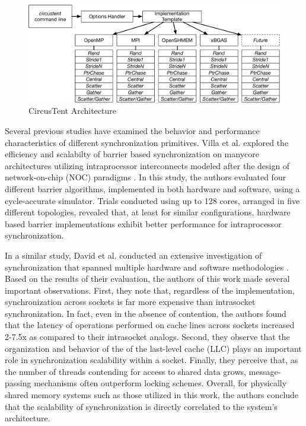 
\begin{figure}[!t]
\centering
\includegraphics[width=5in]{figures/arch.pdf}
\caption{CircusTent Architecture}
\label{fig:ct_arch}
\end{figure}


Several previous studies have examined the behavior and performance characteristics of different synchronization primitives.
Villa et al. explored the efficiency and scalabilty of barrier based synchronization on manycore architectures utilizing intraprocessor interconnects modeled after the design of network-on-chip (NOC) paradigms \cite{villa2008barriers}.
In this study, the authors evaluated four different barrier algorithms, implemented in both hardware and software, using a cycle-accurate simulator.
Trials conducted using up to 128 cores, arranged in five different topologies, revealed that, at least for similar configurations, hardware based barrier implementations exhibit better performance for intraprocessor synchronization.

In a similar study, David et al. conducted an extensive investigation of synchronization that spanned multiple hardware and software methodologies \cite{david2013sync}.
Based on the results of their evaluation, the authors of this work made several important observations.
First, they note that, regardless of the implementation, synchronization across sockets is far more expensive than intrasocket synchronization.
In fact, even in the absence of contention, the authors found that the latency of operations performed on cache lines across sockets increased 2-7.5x as compared to their intrasocket analogs.
Second, they observe that the organization and behavior of the of the last-level cache (LLC) plays an important role in synchronization scalability within a socket.
Finally, they perceive that, as the number of threads contending for access to shared data grows, message-passing mechanisms often outperform locking schemes.
Overall, for physically shared memory systems such as those utilized in this work, the authors conclude that the scalability of synchronization is directly correlated to the system's architecture.

